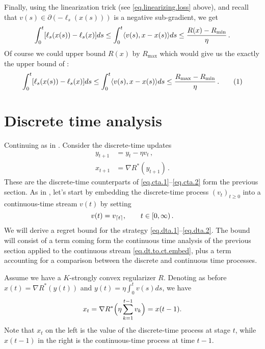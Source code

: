 \documentclass[12pt]{article}
\theoremstyle{plain}
\theoremstyle{definition}
\theoremstyle{remark}
\begin{document}
Finally, using the linearization trick (see \eqref{eq.linearizing.loss} above),
and recall that $v(s) \in \partial (-\ell_{s}(x(s)))$ is a negative sub-gradient,
we get
\begin{align*}
\int_{0}^{t} [\ell_{s}(x(s)) - \ell_{s}(x)] ds
\leq \int_{0}^{t} \langle {v(s), x - x(s)}\rangle ds 
\leq \frac{R(x) - R_{\text{min}}}{\eta}\,.
\end{align*}
Of course we could upper bound $R(x)$ by $R_{\text{max}}$ which
would give us the exactly the upper bound of \cite{Kwon-M}:
\begin{align*}
\int_{0}^{t} [\ell_{s}(x(s)) - \ell_{s}(x)] ds
\leq \int_{0}^{t} \ab{v(s), x - x(s)} ds 
\leq \frac{R_{\text{max}} - R_{\text{min}}}{\eta}\,.
\addtocounter{equation}{1}
\label{eq.cta.bound}  \tag{\theequation}
\end{align*}

\medskip


\section*{Discrete time analysis}

Continuing as in \cite[Section 5]{Kwon-M}.
Consider the discrete-time updates
\begin{align*}
y_{t+1} &= y_{t} - \eta v_{t}\,, \label{eq.dta.1} \tag{1dt'} \\
x_{t+1} &= \nabla R^{*}(y_{t+1})\,. \label{eq.dta.2} \tag{2dt'}
\end{align*}
These are the discrete-time counterparts of \eqref{eq.cta.1}--\eqref{eq.cta.2} form
the previous section. As in \cite{Kwon-M}, let's start by embedding the discrete-time process
$(v_{t})_{t \geq 0}$ into a continuous-time stream $v(t)$ by setting
\begin{equation}
v(t) = v_{\lceil t \rceil},\hspace{7mm} t \in [0,\infty)\,.
\label{eq.dt.to.ct.embed}
\end{equation}
We will derive a regret bound for the strategy \eqref{eq.dta.1}--\eqref{eq.dta.2}.
The bound will consist of a term coming form the continuous time analysis of the previous section 
applied to the continuous stream \eqref{eq.dt.to.ct.embed}, 
plus a term accounting for a comparison between the discrete and continuous time processes.

\medskip

Assume we have a $K$-strongly convex regularizer $R$.
Denoting as before $x(t) = \nabla R^{*} (y(t))$ and $y(t) = \eta \int_{0}^{t} v(s) ds$,
we have
$$
x_{t} = \nabla R^{*} \Bigl( \eta \sum_{k=1}^{t-1} v_{k} \Bigr) = x(t-1).
$$
Note that $x_t$ on the left is the value of the discrete-time process at stage $t$,
while $x(t-1)$ in the right is the continuous-time process at time $t-1$.
\end{document}
